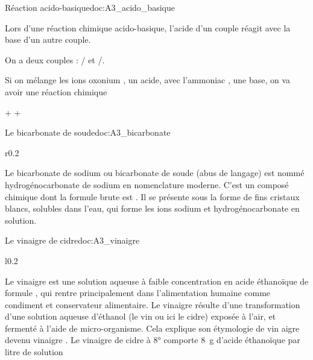 
\begin{doc}{Réaction acido-basique}{doc:A3_acido_basique}
  \begin{importants}  
    Lors d'une réaction chimique acido-basique, l'acide d'un couple réagit avec la base d'un autre couple.
  \end{importants}
  
  \exemple On a deux couples : / et /.

  Si on mélange les ions oxonium , un acide, avec l'ammoniac , une base, on va avoir une réaction chimique
  \vspace*{-12pt}
  \begin{center}
     +  \reaction {} + 
  \end{center}
\end{doc}


\newpage
\vspace*{-40pt}

\begin{doc}{Le bicarbonate de soude}{doc:A3_bicarbonate}
  \begin{wrapfigure}{r}{0.2\linewidth}
    \vspace*{-38pt}
    \centering
  \end{wrapfigure}
  Le bicarbonate de sodium ou bicarbonate de soude (abus de langage) est nommé hydrogénocarbonate de sodium en nomenclature moderne.
  C’est un composé chimique dont la formule brute est .
  Il se présente sous la forme de fins cristaux blancs, solubles dans l’eau, qui forme les ions sodium  et hydrogénocarbonate  en solution.
\end{doc}

\begin{doc}{Le vinaigre de cidre}{doc:A3_vinaigre}
  \begin{wrapfigure}{l}{0.2\linewidth}
    \vspace*{-22pt}
    \centering
  \end{wrapfigure}
  Le vinaigre est une solution aqueuse à faible concentration en acide éthanoïque de
  formule , qui rentre principalement dans l'alimentation humaine comme condiment et conservateur alimentaire. 
  Le vinaigre résulte d'une transformation d'une solution aqueuse d'éthanol (le vin ou ici le cidre) exposée à l'air, et fermenté à l’aide de micro-organisme.
  Cela explique son étymologie de \og vin aigre \fg\; devenu \og vinaigre \fg.
  Le vinaigre de cidre à 8° comporte \qty{8}{\g} d’acide éthanoïque par litre de solution
\end{doc}

